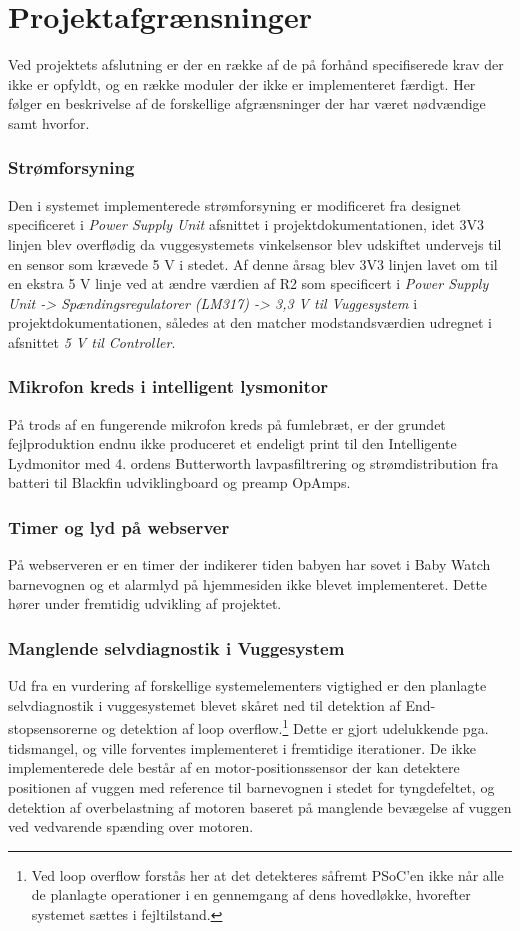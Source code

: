 %
\chapter{Projektafgrænsninger}
\label{projektafgraensninger}
Ved projektets afslutning er der en række af de på forhånd specifiserede krav der ikke er opfyldt, og en række moduler der ikke er implementeret færdigt. Her følger en beskrivelse af de forskellige afgrænsninger der har været nødvændige samt hvorfor. 

\subsection{Strømforsyning}
Den i systemet implementerede strømforsyning er modificeret fra designet specificeret i \textit{Power Supply Unit} afsnittet i projektdokumentationen, idet 3V3 linjen blev overflødig da vuggesystemets vinkelsensor blev udskiftet undervejs til en sensor som krævede 5 V i stedet. Af denne årsag blev 3V3 linjen lavet om til en ekstra 5 V linje ved at ændre værdien af R2 som specificert i \textit{Power Supply Unit -> Spændingsregulatorer (LM317) -> 3,3 V til Vuggesystem} i projektdokumentationen, således at den matcher modstandsværdien udregnet i afsnittet \textit{5 V til Controller}.

\subsection{Mikrofon kreds i intelligent lysmonitor}
På trods af en fungerende mikrofon kreds på fumlebræt, er der grundet fejlproduktion endnu ikke produceret et endeligt print til den Intelligente Lydmonitor med 4. ordens Butterworth lavpasfiltrering og strømdistribution fra batteri til Blackfin udviklingboard og preamp OpAmps.

\subsection{Timer og lyd på webserver}
På webserveren er en timer der indikerer tiden babyen har sovet i Baby Watch barnevognen og et alarmlyd på hjemmesiden ikke blevet implementeret. Dette hører under fremtidig udvikling af projektet. 

\subsection{Manglende selvdiagnostik i Vuggesystem}
Ud fra en vurdering af forskellige systemelementers vigtighed er den planlagte selvdiagnostik i vuggesystemet blevet skåret ned til detektion af End-stopsensorerne og detektion af loop overflow.\footnote{Ved loop overflow forstås her at det detekteres såfremt PSoC'en ikke når alle de planlagte operationer i en gennemgang af dens hovedløkke, hvorefter systemet sættes i fejltilstand.} Dette er gjort udelukkende pga. tidsmangel, og ville forventes implementeret i fremtidige iterationer. De ikke implementerede dele består af en motor-positionssensor der kan detektere positionen af vuggen med reference til barnevognen i stedet for tyngdefeltet, og detektion af overbelastning af motoren baseret på manglende bevægelse af vuggen ved vedvarende spænding over motoren. 

